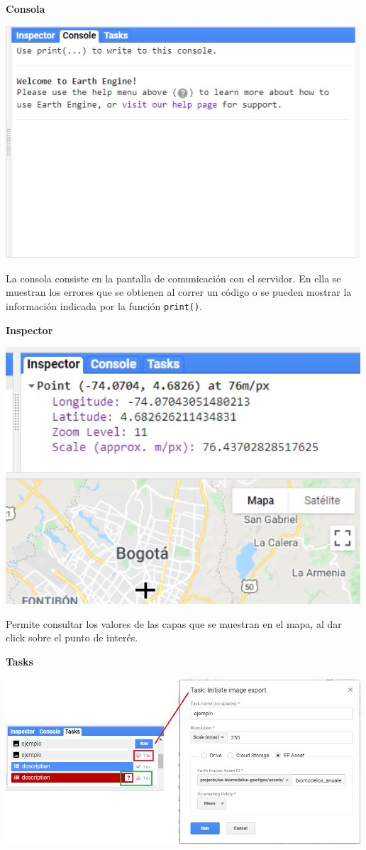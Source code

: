 \documentclass[
]{article}
\begin{document}
\textbf{Consola}

\includegraphics[width=500px]{Img/rigthPanel}

La consola consiste en la pantalla de comunicación con el servidor. En
ella se muestran los errores que se obtienen al correr un código o se
pueden mostrar la información indicada por la función \texttt{print()}.

\textbf{Inspector}

\includegraphics[width=500px]{Img/inspector}

Permite consultar los valores de las capas que se muestran en el mapa,
al dar click sobre el punto de interés.

\textbf{Tasks}

\includegraphics[width=500px]{Img/task}
\end{document}
